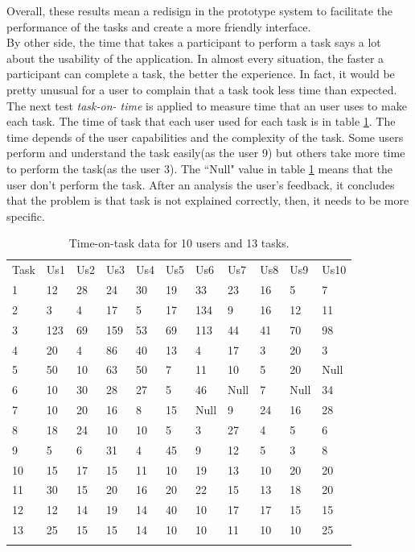 Overall, these results mean a redisign in the
prototype system to facilitate the performance of the tasks 
and create a more friendly interface.\\ 
By other side, the time that takes a participant to perform a task
says a lot about the usability of the application. In almost every
situation, the faster a participant can complete a task, the better
the experience. In fact, it would be pretty unusual for a user to
complain that a task took less time than
expected\cite{albert2013measuring}.\\  The next test \textit{task-on-
time} is applied to measure time that an user uses to make each task.
The time of task that each user used for each task is in table
\ref{tab:datausers}. The time depends of the user capabilities and the
complexity of the task. Some users perform and understand the task
easily(as the user 9) but others take more time to perform the task(as
the user 3). The ``Null" value in table \ref{tab:datausers} means that
the user don't perform the task. After an analysis the user's
feedback, it concludes that the problem is that task is not explained
correctly, then, it needs to be more specific.
\begin{table}
\centering
\small
\captionsetup{font=footnotesize}
\caption{Time-on-task data for 10 users and 13 tasks.}
\label{tab:datausers}  
\begin{tabular}{lllllllllll}
\hline\noalign{\smallskip}
Task  & Us1  & Us2 & Us3 & Us4 & Us5 & Us6 & Us7 & Us8 & Us9 & Us10 \\
\noalign{\smallskip}\hline\noalign{\smallskip}
1 & 12  & 28 & 24 & 30 & 19 & 33  & 23 & 16 & 5  & 7 \\
2 & 3   & 4  & 17 & 5  & 17 & 134 & 9  & 16 & 12 & 11 \\
3 & 123 & 69 & 159& 53 & 69 & 113 & 44 & 41 & 70 & 98 \\
4 & 20  & 4  & 86 & 40 & 13 & 4   & 17 & 3  & 20 & 3 \\
5 & 50  & 10 & 63 & 50 & 7  & 11  & 10 & 5  & 20 & Null \\
6 & 10  & 30 & 28 & 27 & 5  & 46  & Null  & 7  & Null  & 34 \\
7 & 10  & 20 & 16 & 8  & 15 & Null & 9  & 24 & 16 & 28 \\
8 & 18  & 24 & 10 & 10 & 5  & 3   & 27 & 4  & 5  & 6 \\
9 & 5   & 6  & 31 & 4  & 45 & 9   & 12 & 5  & 3  & 8 \\
10 & 15 & 17 & 15 & 11 & 10 & 19  & 13 & 10 & 20 & 20 \\
11 & 30 & 15 & 20 & 16 & 20 & 22  & 15 & 13 & 18 & 20 \\
12 & 12 & 14 & 19 & 14 & 40 & 10  & 17 & 17 & 15 & 15 \\
13 & 25 & 15 & 15 & 14 & 10 & 10  & 11 & 10 & 10 & 25 \\
\noalign{\smallskip}\hline
\end{tabular}
\end{table}

